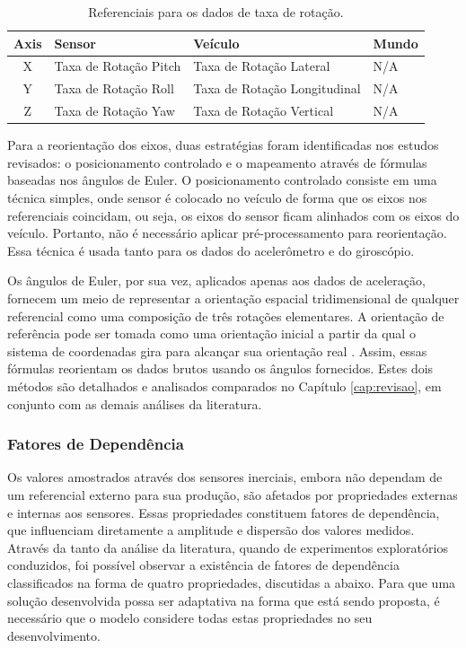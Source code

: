 \begin{table}[h!]
    \caption{Referenciais para os dados de taxa de rotação.}
    \label{table:gyroscope_reference_frames}
    \centering
    \begin{tabular}{clll}
        \toprule
        \textbf{Axis} & \textbf{Sensor} & \textbf{Veículo} & \textbf{Mundo} \\
        \toprule
        X & Taxa de Rotação Pitch & Taxa de Rotação Lateral & N/A \\
        \midrule
        Y & Taxa de Rotação Roll & Taxa de Rotação Longitudinal & N/A \\
        \midrule
        Z & Taxa de Rotação Yaw & Taxa de Rotação Vertical & N/A \\
        \bottomrule
    \end{tabular}
\end{table}

Para a reorientação dos eixos, duas estratégias foram identificadas nos estudos revisados: o posicionamento controlado e o mapeamento através de fórmulas baseadas nos ângulos de Euler. O posicionamento controlado consiste em uma técnica simples, onde sensor é colocado no veículo de forma que os eixos nos referenciais coincidam, ou seja, os eixos do sensor ficam alinhados com os eixos do veículo. Portanto, não é necessário aplicar pré-processamento para reorientação. Essa técnica é usada tanto para os dados do acelerômetro e do giroscópio. 

Os ângulos de Euler, por sua vez, aplicados apenas aos dados de aceleração, fornecem um meio de representar a orientação espacial tridimensional de qualquer referencial como uma composição de três rotações elementares. A orientação de referência pode ser tomada como uma orientação inicial a partir da qual o sistema de coordenadas gira para alcançar sua orientação real \cite{Singh2017}. Assim, essas fórmulas reorientam os dados brutos usando os ângulos fornecidos. Estes dois métodos são detalhados e analisados comparados no Capítulo \ref{cap:revisao}, em conjunto com as demais análises da literatura. 

\subsubsection{Fatores de Dependência}

Os valores amostrados através dos sensores inerciais, embora não dependam de um referencial externo para sua produção, são afetados por propriedades externas e internas aos sensores. Essas propriedades constituem fatores de dependência, que influenciam diretamente a amplitude e dispersão dos valores medidos. Através da tanto da análise da literatura, quando de experimentos exploratórios conduzidos, foi possível observar a existência de fatores de dependência classificados na forma de quatro propriedades, discutidas a abaixo. Para que uma solução desenvolvida possa ser adaptativa na forma que está sendo proposta, é necessário que o modelo considere todas estas propriedades no seu desenvolvimento.

